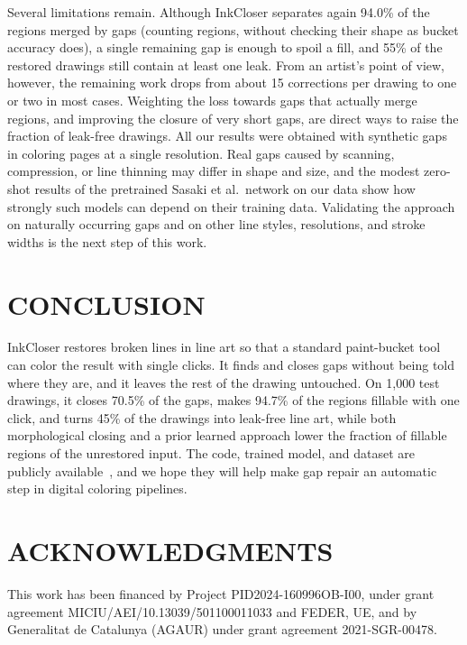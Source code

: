 \documentclass{IEEEcsmag}
\providecommand{\DIFaddtex}[1]{{\color{blue}#1}} %
\providecommand{\DIFdeltex}[1]{} %
\providecommand{\DIFaddbegin}{} %
\providecommand{\DIFaddend}{} %
\providecommand{\DIFdelbegin}{} %
\providecommand{\DIFdelend}{} %
\providecommand{\DIFaddtex}[1]{\DIFaddtex{#1}} %
\providecommand{\DIFdeltex}[1]{\DIFdeltex{#1}} %
\providecommand{\DIFaddbegin}{} %
\providecommand{\DIFadd}[1]{\texorpdfstring{\DIFaddtex{#1}}{#1}} %
\providecommand{\DIFdel}[1]{\texorpdfstring{\DIFdeltex{#1}}{}} %
\begin{document}
Several limitations remain. Although InkCloser separates \DIFaddbegin \DIFadd{again }\DIFaddend 94.0\% of the regions merged
by gaps \DIFdelbegin \DIFdel{, }\DIFdelend \DIFaddbegin \DIFadd{(counting regions, without checking their shape as bucket accuracy does), }\DIFaddend a single remaining gap is enough to spoil a fill, and 55\% of the restored
drawings still contain at least one leak. From an artist's point of view, however,
the remaining work drops from about 15 corrections per drawing to one or two in most
cases. Weighting the loss towards gaps that actually merge regions, and improving the
closure of very short gaps, are direct ways to raise the fraction of leak-free
drawings. All our results were obtained with synthetic gaps in coloring pages at a
single resolution. Real gaps caused by scanning, compression, or line thinning may
differ in shape and size, and the modest zero-shot results of the pretrained Sasaki
et al.\ network on our data show how strongly such models can depend on their
training data. Validating the approach on naturally occurring gaps and on other line
styles, resolutions, and stroke widths is the next step of this work.

\section{CONCLUSION}

InkCloser restores broken lines in line art so that a standard paint-bucket tool can
color the result with single clicks. It finds and closes gaps without being told
where they are, and it leaves the rest of the drawing untouched. On 1,000 test
drawings, it closes 70.5\% of the gaps, makes 94.7\% of the regions fillable with one
click, and turns 45\% of the drawings into leak-free line art, while \DIFdelbegin \DIFdel{neither
morphological closing nor }\DIFdelend \DIFaddbegin \DIFadd{both
morphological closing and }\DIFaddend a prior learned approach \DIFdelbegin \DIFdel{improves on }\DIFdelend \DIFaddbegin \DIFadd{lower the fraction of fillable
regions of }\DIFaddend the unrestored input.
The code, trained model, and dataset are publicly
available~\cite{codeInkCloser,datasetInkCloser}, and we hope they will help make gap
repair an automatic step in digital coloring pipelines.

\section{ACKNOWLEDGMENTS}

This work has been financed by Project PID2024-160996OB-I00, under grant agreement
MICIU/AEI/10.13039/501100011033 and FEDER, UE, and by Generalitat de Catalunya
(AGAUR) under grant agreement 2021-SGR-00478.
\end{document}
